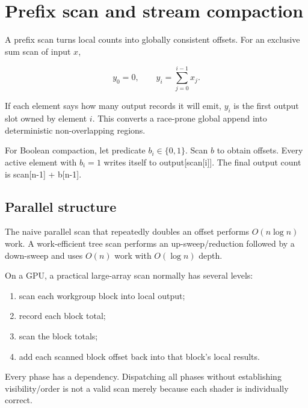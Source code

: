 \hypertarget{appendix-f2ee4d086415}{}\label{referencestart:appendix-f2ee4d086415}
\section{Prefix scan and stream compaction}\label{appendix-f2ee4d086415-prefix-scan-and-stream-compaction}

\hypertarget{appendix-f2ee4d086415-prefix-scan-and-stream-compaction}{}

A prefix scan turns local counts into globally consistent offsets. For an exclusive sum scan of input \(x\),

\[
y_0=0,
\qquad
y_i=\sum_{j=0}^{i-1}x_j.
\]

If each element says how many output records it will emit, \(y_i\) is the first output slot owned by element \(i\). This converts a race-prone global append into deterministic non-overlapping regions.

For Boolean compaction, let predicate \(b_i\in\{0,1\}\). Scan \(b\) to obtain offsets. Every active element with \(b_i=1\) writes itself to output{[}scan{[}i{]}{]}. The final output count is scan{[}n-1{]} + b{[}n-1{]}.

\subsection{Parallel structure}\label{appendix-f2ee4d086415-parallel-structure}

\hypertarget{appendix-f2ee4d086415-parallel-structure}{}

The naive parallel scan that repeatedly doubles an offset performs \(O(n\log n)\) work. A work-efficient tree scan performs an up-sweep/reduction followed by a down-sweep and uses \(O(n)\) work with \(O(\log n)\) depth.

On a GPU, a practical large-array scan normally has several levels:

\begin{enumerate}
\def\labelenumi{\arabic{enumi}.}
\tightlist
\item
  scan each workgroup block into local output;
\item
  record each block total;
\item
  scan the block totals;
\item
  add each scanned block offset back into that block's local results.
\end{enumerate}

Every phase has a dependency. Dispatching all phases without establishing visibility/order is not a valid scan merely because each shader is individually correct.

